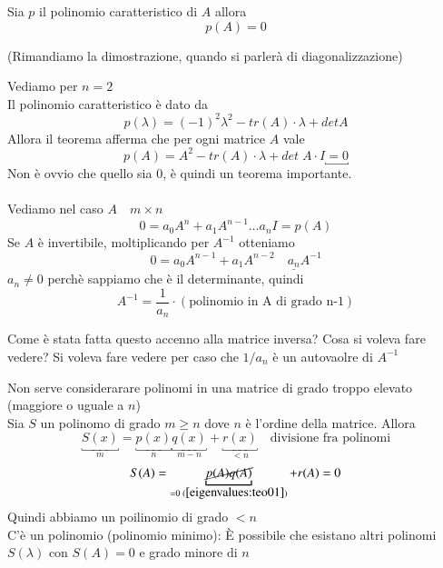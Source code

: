 \begin{theo}
\label{eigenvalues:teo01} 
 Sia $p$ il polinomio caratteristico di $A$ allora
 $$ p(A) = 0$$
\end{theo}
\begin{thproof}
 (Rimandiamo la dimostrazione, quando si parler\`a di diagonalizzazione) 
\end{thproof}
Vediamo per $n = 2$ \\
Il polinomio caratteristico \`e dato da
$$ p(\lambda) = (-1)^{2} \lambda^{2} - tr(A)\cdot \lambda + detA $$
Allora il teorema afferma che per ogni matrice $A$ vale
$$p(A) = A^2 - tr(A) \cdot \lambda + det\; A \cdot I \underbracket{ = 0
} $$
Non \`e ovvio che quello sia 0, \`e quindi un teorema importante.
 \\ \\
Vediamo nel caso $A \quad m \times n$
\begin{equation}
\label{eigenvalues:eq002} 0 = a_{0}A^{n} + a_1 A ^{n-1} \ldots a_{n}I  =  p(A)
\end{equation}
Se $A$ \`e invertibile, moltiplicando per $A^{-1}$ otteniamo
$$ 0 = a_0 A^{n-1} + a_1 A^{n-2} \quad \underline{a_n}A^{-1}$$
$a_n \neq 0$ perch\`e sappiamo che \`e il determinante, quindi
$$ A^{-1} = \frac{1}{a_n}\cdot \left( \text{polinomio in A di grado n-1} \right) $$
\begin{openquestion}
Come \`e stata fatta questo accenno alla matrice inversa?
Cosa si voleva fare vedere? Si voleva fare vedere per
caso che $1/a_{n}$ \`e un autovaolre di $A^{-1}$
\end{openquestion}
Non serve considerarare polinomi in una matrice di grado troppo elevato
 (maggiore o uguale a $n$) \\
Sia $S$ un polinomo di grado $m \geq n$ dove $n$ \`e l'ordine della matrice.
Allora 
$$ \underbracket{S(x)}_{m}  = \underbracket{p(x)}_{n}\underbracket{q(x)}_{m-n} + \underbracket{r(x)}_{< n} \quad \text{divisione fra polinomi} $$
$$S(A) = \underbracket{\cancel{p(A) q(A)}}_{=0 \;(\ref{eigenvalues:teo01})} + r(A) = 0$$
Quindi abbiamo un poilinomio di grado $< n$ \\
C'\`e un polinomio (polinomio minimo): \`E possibile che esistano altri
 polinomi $S(\lambda)$
con $S(A) = 0$ e grado minore di $n$
